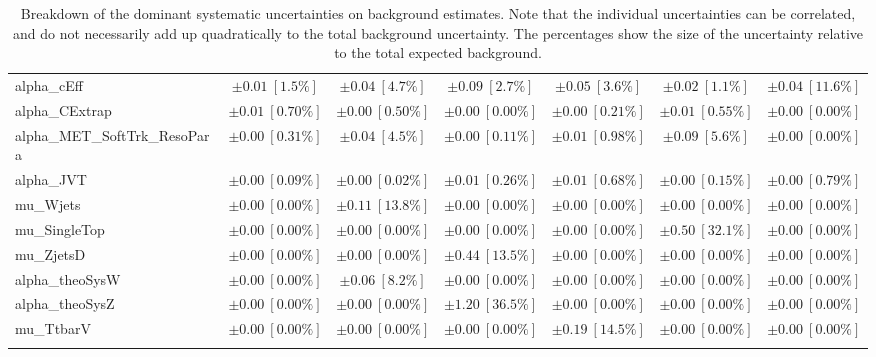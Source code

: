 \begin{sidewaystable}
\begin{center}
\begin{tabular*}{\textwidth}{@{\extracolsep{\fill}}lcccccc}
alpha\_cEff         & $\pm 0.01\ [1.5\%] $          & $\pm 0.04\ [4.7\%] $          & $\pm 0.09\ [2.7\%] $          & $\pm 0.05\ [3.6\%] $          & $\pm 0.02\ [1.1\%] $          & $\pm 0.04\ [11.6\%] $       \\
alpha\_CExtrap         & $\pm 0.01\ [0.70\%] $          & $\pm 0.00\ [0.50\%] $          & $\pm 0.00\ [0.00\%] $          & $\pm 0.00\ [0.21\%] $          & $\pm 0.01\ [0.55\%] $          & $\pm 0.00\ [0.00\%] $       \\
alpha\_MET\_SoftTrk\_ResoPara         & $\pm 0.00\ [0.31\%] $          & $\pm 0.04\ [4.5\%] $          & $\pm 0.00\ [0.11\%] $          & $\pm 0.01\ [0.98\%] $          & $\pm 0.09\ [5.6\%] $          & $\pm 0.00\ [0.00\%] $       \\
alpha\_JVT         & $\pm 0.00\ [0.09\%] $          & $\pm 0.00\ [0.02\%] $          & $\pm 0.01\ [0.26\%] $          & $\pm 0.01\ [0.68\%] $          & $\pm 0.00\ [0.15\%] $          & $\pm 0.00\ [0.79\%] $       \\
mu\_Wjets         & $\pm 0.00\ [0.00\%] $          & $\pm 0.11\ [13.8\%] $          & $\pm 0.00\ [0.00\%] $          & $\pm 0.00\ [0.00\%] $          & $\pm 0.00\ [0.00\%] $          & $\pm 0.00\ [0.00\%] $       \\
mu\_SingleTop         & $\pm 0.00\ [0.00\%] $          & $\pm 0.00\ [0.00\%] $          & $\pm 0.00\ [0.00\%] $          & $\pm 0.00\ [0.00\%] $          & $\pm 0.50\ [32.1\%] $          & $\pm 0.00\ [0.00\%] $       \\
mu\_ZjetsD         & $\pm 0.00\ [0.00\%] $          & $\pm 0.00\ [0.00\%] $          & $\pm 0.44\ [13.5\%] $          & $\pm 0.00\ [0.00\%] $          & $\pm 0.00\ [0.00\%] $          & $\pm 0.00\ [0.00\%] $       \\
alpha\_theoSysW         & $\pm 0.00\ [0.00\%] $          & $\pm 0.06\ [8.2\%] $          & $\pm 0.00\ [0.00\%] $          & $\pm 0.00\ [0.00\%] $          & $\pm 0.00\ [0.00\%] $          & $\pm 0.00\ [0.00\%] $       \\
alpha\_theoSysZ         & $\pm 0.00\ [0.00\%] $          & $\pm 0.00\ [0.00\%] $          & $\pm 1.20\ [36.5\%] $          & $\pm 0.00\ [0.00\%] $          & $\pm 0.00\ [0.00\%] $          & $\pm 0.00\ [0.00\%] $       \\
mu\_TtbarV         & $\pm 0.00\ [0.00\%] $          & $\pm 0.00\ [0.00\%] $          & $\pm 0.00\ [0.00\%] $          & $\pm 0.19\ [14.5\%] $          & $\pm 0.00\ [0.00\%] $          & $\pm 0.00\ [0.00\%] $       \\
\noalign{\smallskip}\hline\noalign{\smallskip}
\end{tabular*}
\end{center}
\caption[Breakdown of uncertainty on background estimates]{
Breakdown of the dominant systematic uncertainties on background estimates.
Note that the individual uncertainties can be correlated, and do not necessarily add up quadratically to 
the total background uncertainty. The percentages show the size of the uncertainty relative to the total expected background.
\label{table.results.bkgestimate.uncertainties.SRD_high_bybkg}}
\end{sidewaystable}
%
